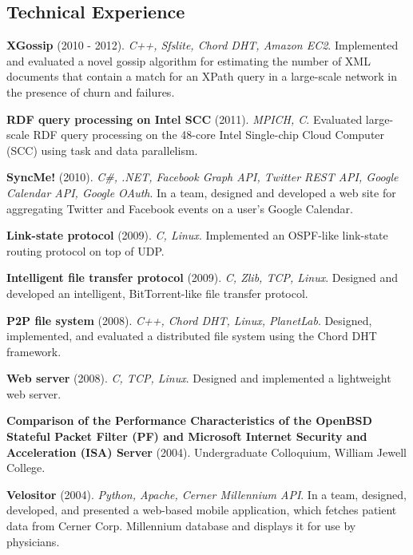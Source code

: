 \documentclass[margin,line]{resume}
\begin{document}
\begin{resume}
    \section{\mysidestyle Technical Experience}
    
    \textbf{XGossip} (2010 - 2012). \textsl{C++, Sfslite, Chord DHT, Amazon EC2}. Implemented and evaluated a novel gossip algorithm for estimating the number of XML documents that contain a match for an XPath query in a large-scale network in the presence of churn and failures.

\vspace{-2mm}
    \textbf{RDF query processing on Intel SCC} (2011). \textsl{MPICH, C}. Evaluated large-scale RDF query processing on the 48-core Intel Single-chip Cloud Computer (SCC) using task and data parallelism.
    
\vspace{-2mm}
    \textbf{SyncMe!} (2010). \textsl{C\#, .NET, Facebook Graph API, Twitter REST API, Google Calendar API, Google OAuth}. In a team, designed and developed a web site for aggregating Twitter and Facebook events on a user's Google Calendar.

\vspace{-2mm}
    \textbf{Link-state protocol} (2009). \textsl{C, Linux}. Implemented an OSPF-like link-state routing protocol on top of UDP.

\vspace{-2mm}
    \textbf{Intelligent file transfer protocol} (2009). \textsl{C, Zlib, TCP, Linux}. Designed and developed an intelligent, BitTorrent-like file transfer protocol.

\vspace{-2mm}
    \textbf{P2P file system} (2008). \textsl{C++, Chord DHT, Linux, PlanetLab}. Designed, implemented, and evaluated a distributed file system using the Chord DHT framework.

\vspace{-2mm}
    \textbf{Web server} (2008). \textsl{C, TCP, Linux}. Designed and implemented a lightweight web server.
    
\vspace{-2mm}
    \textbf{Comparison of the Performance Characteristics of the OpenBSD Stateful Packet Filter (PF) and Microsoft Internet Security and Acceleration (ISA) Server} (2004). Undergraduate Colloquium, William Jewell College.

\vspace{-2mm}    
    \textbf{Velositor} (2004). \textsl{Python, Apache, Cerner Millennium API}. In a team, designed, developed, and presented a web-based mobile application, which fetches patient data from Cerner Corp. Millennium database and displays it for use by physicians.


\end{resume}
\end{document}
